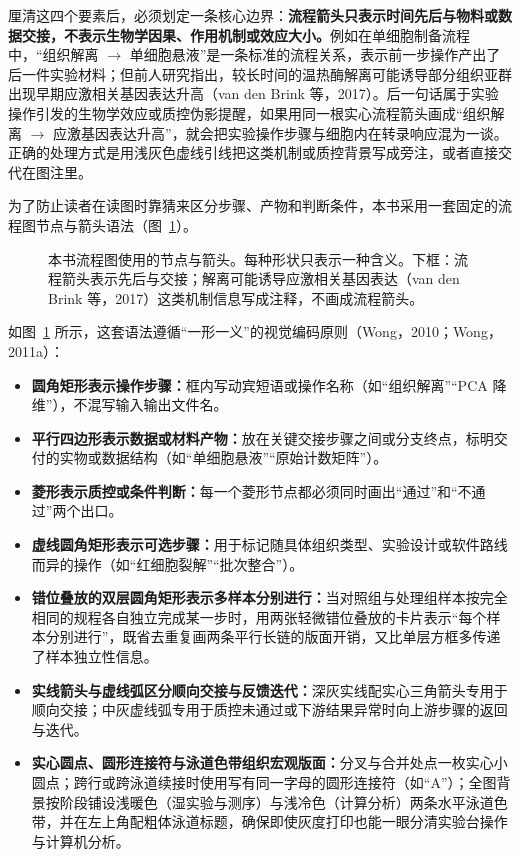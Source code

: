 厘清这四个要素后，必须划定一条核心边界：\textbf{流程箭头只表示时间先后与物料或数据交接，不表示生物学因果、作用机制或效应大小。}例如在单细胞制备流程中，“组织解离 $\rightarrow$ 单细胞悬液”是一条标准的流程关系，表示前一步操作产出了后一件实验材料；但前人研究指出，较长时间的温热酶解离可能诱导部分组织亚群出现早期应激相关基因表达升高（van den Brink 等，2017）。后一句话属于实验操作引发的生物学效应或质控伪影提醒，如果用同一根实心流程箭头画成“组织解离 $\rightarrow$ 应激基因表达升高”，就会把实验操作步骤与细胞内在转录响应混为一谈。正确的处理方式是用浅灰色虚线引线把这类机制或质控背景写成旁注，或者直接交代在图注里。

为了防止读者在读图时靠猜来区分步骤、产物和判断条件，本书采用一套固定的流程图节点与箭头语法（图~\ref{fig:ch06-02}）。

\begin{figure}[htbp]\centering

\caption{本书流程图使用的节点与箭头。每种形状只表示一种含义。下框：流程箭头表示先后与交接；解离可能诱导应激相关基因表达（van den Brink 等，2017）这类机制信息写成注释，不画成流程箭头。}\label{fig:ch06-02}
\end{figure}

如图~\ref{fig:ch06-02} 所示，这套语法遵循“一形一义”的视觉编码原则（Wong，2010；Wong，2011a）：
\begin{itemize}
\item \textbf{圆角矩形表示操作步骤：}框内写动宾短语或操作名称（如“组织解离”“PCA 降维”），不混写输入输出文件名。
\item \textbf{平行四边形表示数据或材料产物：}放在关键交接步骤之间或分支终点，标明交付的实物或数据结构（如“单细胞悬液”“原始计数矩阵”）。
\item \textbf{菱形表示质控或条件判断：}每一个菱形节点都必须同时画出“通过”和“不通过”两个出口。
\item \textbf{虚线圆角矩形表示可选步骤：}用于标记随具体组织类型、实验设计或软件路线而异的操作（如“红细胞裂解”“批次整合”）。
\item \textbf{错位叠放的双层圆角矩形表示多样本分别进行：}当对照组与处理组样本按完全相同的规程各自独立完成某一步时，用两张轻微错位叠放的卡片表示“每个样本分别进行”，既省去重复画两条平行长链的版面开销，又比单层方框多传递了样本独立性信息。
\item \textbf{实线箭头与虚线弧区分顺向交接与反馈迭代：}深灰实线配实心三角箭头专用于顺向交接；中灰虚线弧专用于质控未通过或下游结果异常时向上游步骤的返回与迭代。
\item \textbf{实心圆点、圆形连接符与泳道色带组织宏观版面：}分叉与合并处点一枚实心小圆点；跨行或跨泳道续接时使用写有同一字母的圆形连接符（如“A”）；全图背景按阶段铺设浅暖色（湿实验与测序）与浅冷色（计算分析）两条水平泳道色带，并在左上角配粗体泳道标题，确保即使灰度打印也能一眼分清实验台操作与计算机分析。
\end{itemize}


